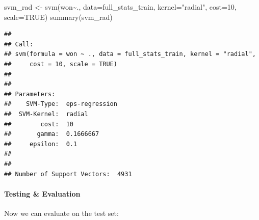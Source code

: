 \documentclass[
]{article}
\newenvironment{Shaded}{\begin{snugshade}}{\end{snugshade}}
\newcommand{\AttributeTok}[1]{\textcolor[rgb]{0.77,0.63,0.00}{#1}}
\newcommand{\ConstantTok}[1]{\textcolor[rgb]{0.00,0.00,0.00}{#1}}
\newcommand{\DecValTok}[1]{\textcolor[rgb]{0.00,0.00,0.81}{#1}}
\newcommand{\FloatTok}[1]{\textcolor[rgb]{0.00,0.00,0.81}{#1}}
\newcommand{\FunctionTok}[1]{\textcolor[rgb]{0.00,0.00,0.00}{#1}}
\newcommand{\NormalTok}[1]{#1}
\newcommand{\OtherTok}[1]{\textcolor[rgb]{0.56,0.35,0.01}{#1}}
\newcommand{\SpecialCharTok}[1]{\textcolor[rgb]{0.00,0.00,0.00}{#1}}
\newcommand{\StringTok}[1]{\textcolor[rgb]{0.31,0.60,0.02}{#1}}
\begin{document}
\begin{Shaded}
\begin{Highlighting}[]
\NormalTok{svm\_rad }\OtherTok{\textless{}{-}} \FunctionTok{svm}\NormalTok{(won}\SpecialCharTok{\textasciitilde{}}\NormalTok{., }\AttributeTok{data=}\NormalTok{full\_stats\_train, }\AttributeTok{kernel=}\StringTok{"radial"}\NormalTok{, }\AttributeTok{cost=}\DecValTok{10}\NormalTok{, }\AttributeTok{scale=}\ConstantTok{TRUE}\NormalTok{)}
\FunctionTok{summary}\NormalTok{(svm\_rad)}
\end{Highlighting}
\end{Shaded}

\begin{verbatim}
## 
## Call:
## svm(formula = won ~ ., data = full_stats_train, kernel = "radial", 
##     cost = 10, scale = TRUE)
## 
## 
## Parameters:
##    SVM-Type:  eps-regression 
##  SVM-Kernel:  radial 
##        cost:  10 
##       gamma:  0.1666667 
##     epsilon:  0.1 
## 
## 
## Number of Support Vectors:  4931
\end{verbatim}

\hypertarget{testing-evaluation-2}{%
\paragraph{Testing \& Evaluation}\label{testing-evaluation-2}}

Now we can evaluate on the test set:

\begin{Shaded}
\end{Shaded}
\end{document}
